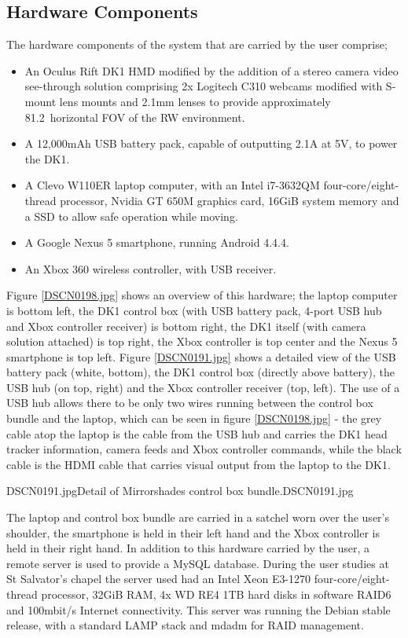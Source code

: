 \subsection{Hardware Components}
The hardware components of the system that are carried by the user comprise;
\begin{itemize}
	\item An Oculus Rift DK1 HMD modified by the addition of a stereo camera video see-through solution comprising 2x Logitech C310 webcams modified with S-mount lens mounts and 2.1mm lenses to provide approximately 81.2\textdegree\ horizontal FOV of the RW environment.
	\item A 12,000mAh USB battery pack, capable of outputting 2.1A at 5V, to power the DK1.
	\item A Clevo W110ER laptop computer, with an Intel i7-3632QM four-core/eight-thread processor, Nvidia GT 650M graphics card, 16GiB system memory and a SSD to allow safe operation while moving.
	\item A Google Nexus 5 smartphone, running Android 4.4.4.
	\item An Xbox 360 wireless controller, with USB receiver.
\end{itemize}

Figure \ref{DSCN0198.jpg} shows an overview of this hardware; the laptop computer is bottom left, the DK1 control box (with USB battery pack, 4-port USB hub and Xbox controller receiver) is bottom right, the DK1 itself (with camera solution attached) is top right, the Xbox controller is top center and the Nexus 5 smartphone is top left. Figure \ref{DSCN0191.jpg} shows a detailed view of the USB battery pack (white, bottom), the DK1 control box (directly above battery), the USB hub (on top, right) and the Xbox controller receiver (top, left). The use of a USB hub allows there to be only two wires running between the control box bundle and the laptop, which can be seen in figure \ref{DSCN0198.jpg} - the grey cable atop the laptop is the cable from the USB hub and carries the DK1 head tracker information, camera feeds and Xbox controller commands, while the black cable is the HDMI cable that carries visual output from the laptop to the DK1.

       {DSCN0191.jpg}{Detail of Mirrorshades control box bundle.}{DSCN0191.jpg}

The laptop and control box bundle are carried in a satchel worn over the user's shoulder, the smartphone is held in their left hand and the Xbox controller is held in their right hand. In addition to this hardware carried by the user, a remote server is used to provide a MySQL database. During the user studies at St Salvator's chapel the server used had an Intel Xeon E3-1270 four-core/eight-thread processor, 32GiB RAM, 4x WD RE4 1TB hard disks in software RAID6 and 100mbit/s Internet connectivity. This server was running the Debian stable release, with a standard LAMP stack and mdadm for RAID management.

